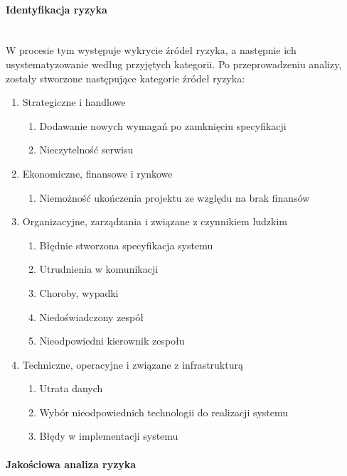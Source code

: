 \documentclass{article}
\begin{document}
\paragraph{Identyfikacja ryzyka}
\mbox{}\\

W procesie tym występuje wykrycie źródeł ryzyka, a następnie ich usystematyzowanie według przyjętych kategorii. Po przeprowadzeniu analizy, zostały stworzone następujące kategorie źródeł ryzyka:

\begin{enumerate}
\item{Strategiczne i handlowe}
	\begin{enumerate}
		\item{Dodawanie nowych wymagań po zamknięciu specyfikacji}
		\item{Nieczytelność serwisu}
	\end{enumerate}
\item{Ekonomiczne, finansowe i rynkowe}
	\begin{enumerate}
		\item{Niemożność ukończenia projektu ze względu na brak finansów}
	\end{enumerate}
\item{Organizacyjne, zarządzania i związane z czynnikiem ludzkim}
	\begin{enumerate}
		\item{Błędnie stworzona specyfikacja systemu}
		\item{Utrudnienia w komunikacji}
		\item{Choroby, wypadki}
		\item{Niedoświadczony zespół}
		\item{Nieodpowiedni kierownik zespołu}
	\end{enumerate}
\item{Techniczne, operacyjne i związane z infrastrukturą}
	\begin{enumerate}
		\item{Utrata danych}
		\item{Wybór nieodpowiednich technologii do realizacji systemu}
		\item{Błędy w implementacji systemu}
	\end{enumerate}
\end{enumerate}

\paragraph{Jakościowa analiza ryzyka} \mbox{}\\
\end{document}
